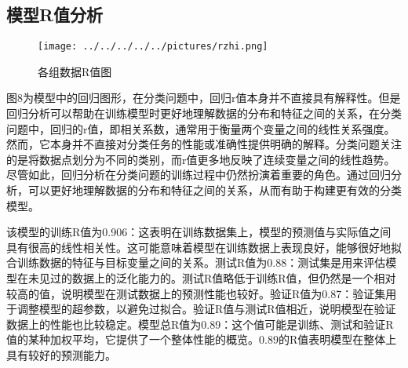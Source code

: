\subsection{模型R值分析}
\begin{figure}
	\centering
	\texttt{[image: ../../../../../pictures/rzhi.png]}
	\caption{各组数据R值图}
\end{figure}

图8为模型中的回归图形，在分类问题中，回归r值本身并不直接具有解释性。但是回归分析可以帮助在训练模型时更好地理解数据的分布和特征之间的关系，在分类问题中，回归的r值，即相关系数，通常用于衡量两个变量之间的线性关系强度。然而，它本身并不直接对分类任务的性能或准确性提供明确的解释。分类问题关注的是将数据点划分为不同的类别，而r值更多地反映了连续变量之间的线性趋势。尽管如此，回归分析在分类问题的训练过程中仍然扮演着重要的角色。通过回归分析，可以更好地理解数据的分布和特征之间的关系，从而有助于构建更有效的分类模型。

该模型的训练R值为0.906：这表明在训练数据集上，模型的预测值与实际值之间具有很高的线性相关性。这可能意味着模型在训练数据上表现良好，能够很好地拟合训练数据的特征与目标变量之间的关系。测试R值为0.88：测试集是用来评估模型在未见过的数据上的泛化能力的。测试R值略低于训练R值，但仍然是一个相对较高的值，说明模型在测试数据上的预测性能也较好。验证R值为0.87：验证集用于调整模型的超参数，以避免过拟合。验证R值与测试R值相近，说明模型在验证数据上的性能也比较稳定。模型总R值为0.89：这个值可能是训练、测试和验证R值的某种加权平均，它提供了一个整体性能的概览。0.89的R值表明模型在整体上具有较好的预测能力。

